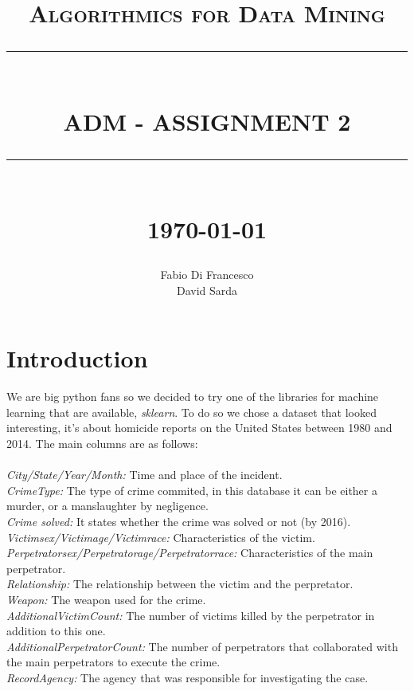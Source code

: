 \documentclass[12pt]{report}
\newcommand{\HRule}[1]{\rule{\linewidth}{#1}}
\begin{document}
\title{ \normalsize \textsc{Algorithmics for Data Mining}
		\\ [2.0cm]
		\HRule{0.5pt} \\
		\LARGE \textbf{\uppercase{ADM - Assignment 2}}
		\HRule{2pt} \\ [0.5cm]
		\normalsize \today \vspace*{5\baselineskip}}

\date{}

\author{
		Fabio Di Francesco \\ 
		David Sarda }

\maketitle
\tableofcontents
\newpage

\sectionfont{\scshape}


\section{Introduction}

We are big python fans so we decided to try one of the libraries for machine learning that are available, \textit{sklearn}. To do so we chose a dataset that looked interesting, it's about homicide reports on the United States between 1980 and 2014. The main columns are as follows:
\\\\
\emph{City/State/Year/Month:} Time and place of the incident.\\
\emph{CrimeType:} The type of crime commited, in this database it can be either a murder, or a manslaughter by negligence.\\
\emph{Crime solved:} It states whether the crime was solved or not (by 2016).\\
\emph{Victim\textunderscore sex/Victim\textunderscore age/Victim\textunderscore race:} Characteristics of the victim.\\
\emph{Perpetrator\textunderscore sex/Perpetrator\textunderscore age/Perpetrator\textunderscore race:} Characteristics of the main perpetrator.\\
\emph{Relationship:} The relationship between the victim and the perpretator.\\
\emph{Weapon:} The weapon used for the crime.\\
\emph{Additional\textunderscore Victim\textunderscore Count:} The number of victims killed by the perpetrator in addition to this one.\\
\emph{Additional\textunderscore Perpetrator\textunderscore Count:} The number of perpetrators that collaborated with the main perpetrators to execute the crime.\\
\emph{Record\textunderscore Agency:} The agency that was responsible for investigating the case.
\end{document}
